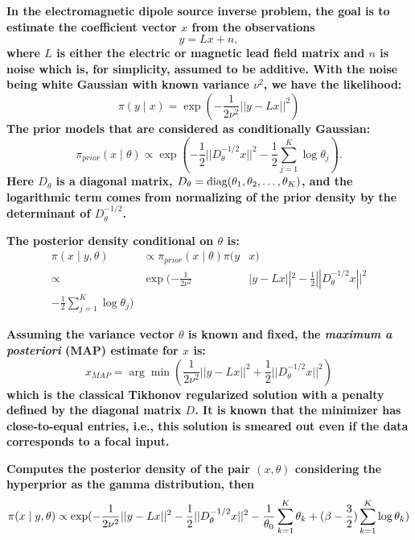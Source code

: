\documentclass[5p]{elsarticle}
\begin{document}
\begin{frontmatter}
\bf In the electromagnetic dipole source inverse problem, the goal is to estimate 
the coefficient vector $x$ from the observations
\begin{equation} y = Lx+n,
\end{equation}
\bf where $L$ is either the electric or magnetic lead field matrix and $n$ is noise which is, for simplicity, assumed to be additive. With the noise being white Gaussian with known variance $\nu ^{2}$, we have the likelihood:
\begin{equation} \pi (y \mid  x  )  = \exp(-\frac{1}{2\nu ^{2}} ||y-L x ||^{2})
\end{equation}
\bf The prior models that are considered as conditionally Gaussian:
\begin{equation} 
\pi _{prior}( x \mid \theta ) \propto \exp(-\frac{1}{2}||D_{\theta }^{-1/2} x ||^{2}-\frac{1}{2}\sum_{j=1}^{K}{\log \theta _{j}}).
\end{equation}
Here $D_{\theta }$ is a diagonal matrix, $D_{\theta }= \hbox{diag}(\theta_{1}, \theta_{2},\ldots , \theta _{K})$, and the logarithmic term comes from normalizing of the prior density by the determinant of $D_{\theta }^{-1/2}$.

\bf The posterior density conditional on $\theta$ is:
\begin{eqnarray} 
\pi (x  \mid y, \theta ) & \propto \pi _{prior}(x \mid \theta )\pi (y&x)
\\
\propto &  \exp(-\frac{1}{2\nu ^{2}}&|y- L x ||^{2}-\frac{1}{2}||D_{\theta 
}^{-1/2} x ||^{2}
\\
-\frac{1}{2}\sum_{j=1}^{K}{\log \theta _{j}}) 
\end{eqnarray}

\bf Assuming the variance vector $\theta$ is known and fixed, the {\em maximum a posteriori} (MAP) estimate for $x$ is:
\begin{equation} x_{MAP}= \arg\min(\frac{1}{2\nu^{2}}||y- L x  ||^{2}+\frac{1}{2}||D_{\theta }^{-1/2} x ||^{2})
\end{equation}
\bf which is the classical Tikhonov regularized solution with a penalty  defined by the diagonal matrix $D$. It is known that the minimizer has close-to-equal entries, i.e., this solution is smeared out even if the data corresponds to a focal input. 

\bf Computes the posterior density of the pair $(x ,\theta )$ considering the hyperprior as the gamma distribution, then
\begin{equation} 
\pi (x \mid y, \theta ) \propto \exp(-\frac{1}{2\nu^{2}}||y- L x  
||^{2} \\ -\frac{1}{2}||D_{\theta }^{-1/2} x ||^{2} \\ -\frac{1}{\theta 
_{0}}\sum_{k=1}^{K}{\theta_{k}}+(\beta -\frac{3}{2})\sum_{k=1}^{K}{\log 
\theta _{k}})
\end{equation}


\end{frontmatter}
\end{document}
